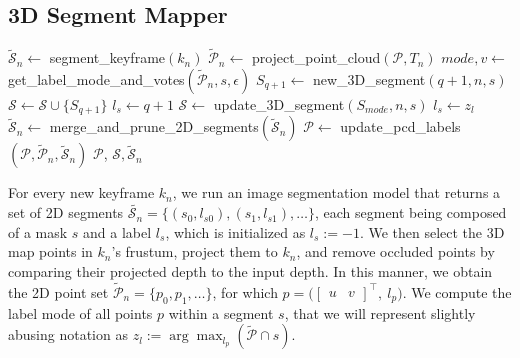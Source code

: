 \subsection{3D Segment Mapper}
\label{sec:mapper}
\begin{algorithm}[t]
\normalsize 
\caption{3D Segment Mapper} 
\begin{algorithmic}[1] 
\footnotesize
{}

    \State $\tilde{\mathcal{S}}_n\leftarrow$ segment\_keyframe$(k_n)$
    \State $\tilde{\mathcal{P}}_n \leftarrow$ project\_point\_cloud$(\mathcal{P},T_n)$
     
    \State $mode, v \leftarrow$ get\_label\_mode\_and\_votes$(\tilde{\mathcal{P}}_n,s,\epsilon)$
     
    \State $S_{q+1} \leftarrow$ new\_3D\_segment$(q+1, n, s)$
    \State $\mathcal{S} \leftarrow \mathcal{S} \cup\{S_{q+1}\}$
    \State $l_s \leftarrow q+1$
    \Else
    \State $\mathcal{S} \leftarrow$ update\_3D\_segment$(S_{mode}, n, s)$
    \State $l_s \leftarrow z_l$
    \EndIf
    \EndIf
    \EndFor
    \State $\tilde{\mathcal{S}}_n \leftarrow$ merge\_and\_prune\_2D\_segments$(\tilde{\mathcal{S}}_n)$
    \State $\mathcal{P} \leftarrow$ update\_pcd\_labels$(\mathcal{P},\tilde{\mathcal{P}}_n, \tilde{\mathcal{S}}_n)$
    \State \Return $\mathcal{P}$, $\mathcal{S}, \tilde{\mathcal{S}}_n$
\EndFunction
\end{algorithmic}
\label{alg:3dsegmentor}
\end{algorithm}

For every new keyframe $k_n$, we run an image segmentation model that returns a set of 2D segments $\tilde{\mathcal{S}_n}=\{ \left(s_0,l_{s0}\right), \left(s_1,l_{s1}\right), \hdots\}$, each segment being composed of a mask $s$ and a label $l_s$, which is initialized as $l_s:=-1$. 
We then select the 3D map points in $k_n$'s frustum, project them to $k_n$, and remove occluded points by comparing their projected depth to the input depth. 
In this manner, we obtain the 2D point set $\tilde{\mathcal{P}}_n=\{p_0, p_1, \hdots\}$, for which $p = \big( \begin{bmatrix}
u & v
\end{bmatrix}^\top, \ l_p \big)$.
We compute the label mode of all points $p$ within a segment $s$, that we will represent slightly abusing notation as $z_l := \arg\max_{l_p}\left(\tilde{\mathcal{P}}\cap s\right)$. 
